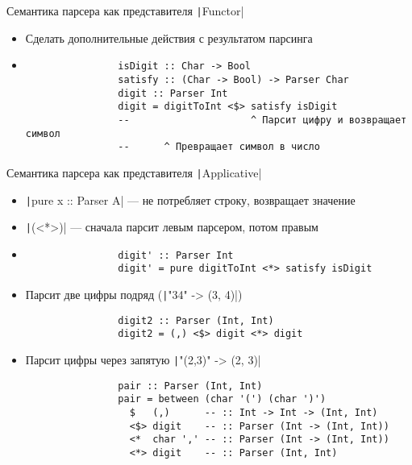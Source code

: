     \begin{frame}[fragile]{Семантика парсера как представителя \texttt|Functor|}
        \vspace{-0.5em}
        \begin{itemize}
            \item Сделать дополнительные действия с результатом парсинга
            \item[\eg]
            \begin{verbatim}
                isDigit :: Char -> Bool
                satisfy :: (Char -> Bool) -> Parser Char
                digit :: Parser Int
                digit = digitToInt <$> satisfy isDigit
                --                     ^ Парсит цифру и возвращает символ
                --      ^ Превращает символ в число
            \end{verbatim}
        \end{itemize}
    \end{frame}

    \begin{frame}[fragile]{Семантика парсера как представителя \texttt|Applicative|}
        \vspace{-0.5em}
        \begin{itemize}
            \item \texttt|pure x :: Parser A| --- не потребляет строку, возвращает значение
            \item \texttt|(<*>)| --- сначала парсит левым парсером, потом правым
            \item[\eg]
            \begin{verbatim}
                digit' :: Parser Int
                digit' = pure digitToInt <*> satisfy isDigit
            \end{verbatim}
            \item[\eg] Парсит две цифры подряд (\texttt|"34" -> (3, 4)|)
            \begin{verbatim}
                digit2 :: Parser (Int, Int)
                digit2 = (,) <$> digit <*> digit
            \end{verbatim}
            \item[\eg] Парсит цифры через запятую \texttt|"(2,3)" -> (2, 3)|
            \begin{verbatim}
                pair :: Parser (Int, Int)
                pair = between (char '(') (char ')')
                  $   (,)      -- :: Int -> Int -> (Int, Int)
                  <$> digit    -- :: Parser (Int -> (Int, Int))
                  <*  char ',' -- :: Parser (Int -> (Int, Int))
                  <*> digit    -- :: Parser (Int, Int)
            \end{verbatim}
        \end{itemize}
    \end{frame}


